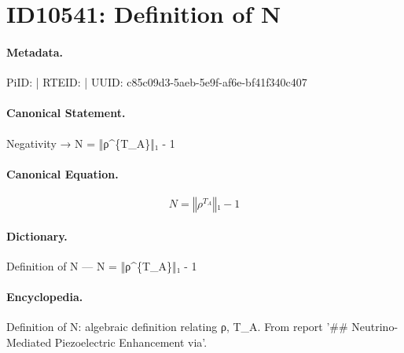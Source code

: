 \section*{ID10541: Definition of N}
\paragraph{Metadata.}
PiID:  | RTEID:  | UUID: c85c09d3-5aeb-5e9f-af6e-bf41f340c407

\paragraph{Canonical Statement.}
Negativity → N = ‖ρ\textasciicircum{}\{T\_A\}‖₁ - 1

\paragraph{Canonical Equation.}
\[
N = ‖ρ^{T_A}‖₁ - 1
\]

\paragraph{Dictionary.}
Definition of N — N = ‖ρ\textasciicircum{}\{T\_A\}‖₁ - 1

\paragraph{Encyclopedia.}
Definition of N: algebraic definition relating ρ, T\_A. From report '\#\# Neutrino-Mediated Piezoelectric Enhancement via'.
